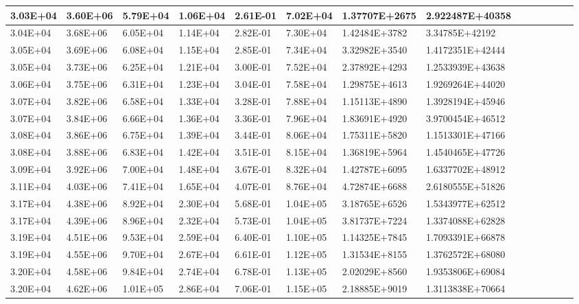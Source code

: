 \documentclass{article}
\begin{document}
\begin{itemize}
\begin{table}[H]
{\begin{tabular}{|l|l|l|l|l|l|l|l|l|l|l|l|l|l|}
    \hline
    3.03E+04 & 3.60E+06 & 5.79E+04 & 1.06E+04 & 2.61E-01 & 7.02E+04 & 1.37707E+2675 & 2.922487E+40358 \\
    \hline
    3.04E+04 & 3.68E+06 & 6.05E+04 & 1.14E+04 & 2.82E-01 & 7.30E+04 & 1.42484E+3782 & 3.34785E+42192 \\
    \hline
    3.05E+04 & 3.69E+06 & 6.08E+04 & 1.15E+04 & 2.85E-01 & 7.34E+04 & 3.32982E+3540 & 1.4172351E+42444 \\
    \hline
    3.05E+04 & 3.73E+06 & 6.25E+04 & 1.21E+04 & 3.00E-01 & 7.52E+04 & 2.37892E+4293 & 1.2533939E+43638 \\
    \hline
    3.06E+04 & 3.75E+06 & 6.31E+04 & 1.23E+04 & 3.04E-01 & 7.58E+04 & 1.29875E+4613 & 1.9269264E+44020 \\
    \hline
    3.07E+04 & 3.82E+06 & 6.58E+04 & 1.33E+04 & 3.28E-01 & 7.88E+04 & 1.15113E+4890 & 1.3928194E+45946 \\
    \hline
    3.07E+04 & 3.84E+06 & 6.66E+04 & 1.36E+04 & 3.36E-01 & 7.96E+04 & 1.83691E+4920 & 3.9700454E+46512 \\
    \hline
    3.08E+04 & 3.86E+06 & 6.75E+04 & 1.39E+04 & 3.44E-01 & 8.06E+04 & 1.75311E+5820 & 1.1513301E+47166 \\
    \hline
    3.08E+04 & 3.88E+06 & 6.83E+04 & 1.42E+04 & 3.51E-01 & 8.15E+04 & 1.36819E+5964 & 1.4540465E+47726 \\
    \hline
    3.09E+04 & 3.92E+06 & 7.00E+04 & 1.48E+04 & 3.67E-01 & 8.32E+04 & 1.42787E+6095 & 1.6337702E+48912 \\
    \hline
    3.11E+04 & 4.03E+06 & 7.41E+04 & 1.65E+04 & 4.07E-01 & 8.76E+04 & 4.72874E+6688 & 2.6180555E+51826 \\
    \hline
    3.17E+04 & 4.38E+06 & 8.92E+04 & 2.30E+04 & 5.68E-01 & 1.04E+05 & 3.18765E+6526 & 1.5343977E+62512 \\
    \hline
    3.17E+04 & 4.39E+06 & 8.96E+04 & 2.32E+04 & 5.73E-01 & 1.04E+05 & 3.81737E+7224 & 1.3374088E+62828 \\
    \hline
    3.19E+04 & 4.51E+06 & 9.53E+04 & 2.59E+04 & 6.40E-01 & 1.10E+05 & 1.14325E+7845 & 1.7093391E+66878 \\
    \hline
    3.19E+04 & 4.55E+06 & 9.70E+04 & 2.67E+04 & 6.61E-01 & 1.12E+05 & 1.31534E+8155 & 1.3762572E+68080 \\
    \hline
    3.20E+04 & 4.58E+06 & 9.84E+04 & 2.74E+04 & 6.78E-01 & 1.13E+05 & 2.02029E+8560 & 1.9353806E+69084 \\
    \hline
    3.20E+04 & 4.62E+06 & 1.01E+05 & 2.86E+04 & 7.06E-01 & 1.15E+05 & 2.18885E+9019 & 1.3113838E+70664 \\

\end{tabular}}
\end{table}
\end{itemize}
\end{document}
